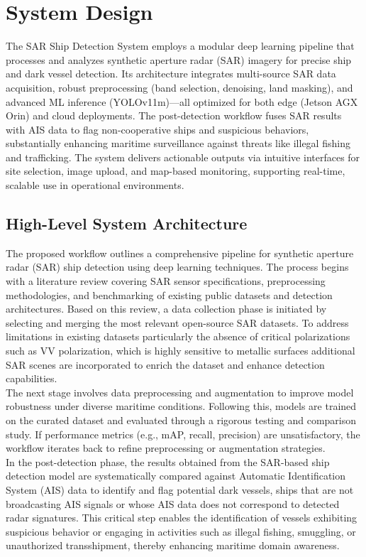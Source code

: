 \documentclass{article}
\begin{document}
	
	
	\newpage
	\section{System Design}
	The SAR Ship Detection System employs a modular deep learning pipeline that processes and analyzes synthetic aperture radar (SAR) imagery for precise ship and dark vessel detection. Its architecture integrates multi-source SAR data acquisition, robust preprocessing (band selection, denoising, land masking), and advanced ML inference (YOLOv11m)—all optimized for both edge (Jetson AGX Orin) and cloud deployments. The post-detection workflow fuses SAR results with AIS data to flag non-cooperative ships and suspicious behaviors, substantially enhancing maritime surveillance against threats like illegal fishing and trafficking. The system delivers actionable outputs via intuitive interfaces for site selection, image upload, and map-based monitoring, supporting real-time, scalable use in operational environments.
	\subsection{High-Level System Architecture}
	The proposed workflow outlines a comprehensive pipeline for synthetic aperture radar (SAR) ship detection using deep learning techniques. The process begins with a literature review covering SAR sensor specifications, preprocessing methodologies, and benchmarking of existing public datasets and detection architectures. Based on this review, a data collection phase is initiated by selecting and merging the most relevant open-source SAR datasets. To address limitations in existing datasets particularly the absence of critical polarizations such as VV polarization, which is highly sensitive to metallic surfaces additional SAR scenes are incorporated to enrich the dataset and enhance detection capabilities.\\
	
	The next stage involves data preprocessing and augmentation to improve model robustness under diverse maritime conditions. Following this, models are trained on the curated dataset and evaluated through a rigorous testing and comparison study. If performance metrics (e.g., mAP, recall, precision) are unsatisfactory, the workflow iterates back to refine preprocessing or augmentation strategies. \\
	
	In the post-detection phase, the results obtained from the SAR-based ship detection model are systematically compared against Automatic Identification System (AIS) data to identify and flag potential dark vessels, ships that are not broadcasting AIS signals or whose AIS data does not correspond to detected radar signatures. This critical step enables the identification of vessels exhibiting suspicious behavior or engaging in activities such as illegal fishing, smuggling, or unauthorized transshipment, thereby enhancing maritime domain awareness.\\
	
\end{document}
